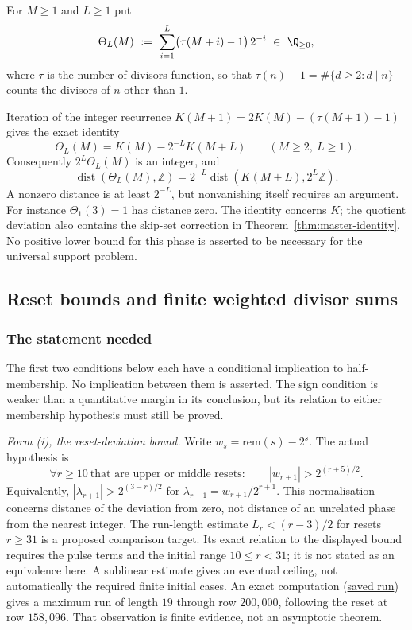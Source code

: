 \begin{defn}
\label{defn:theta}
For $M\ge 1$ and $L\ge 1$ put
\[
\Theta_L(M)\ :=\ \sum_{i=1}^{L}\bigl(\tau(M+i)-1\bigr)\,2^{-i}\ \in\ \Q_{\ge 0},
\]
where $\tau$ is the number-of-divisors function, so that $\tau(n)-1=\#\{d\ge 2: d\mid n\}$ counts
the divisors of $n$ other than $1$.
\end{defn}

Iteration of the integer recurrence
$K(M+1)=2K(M)-(\tau(M+1)-1)$ gives the exact identity
\[
 \Theta_L(M)=K(M)-2^{-L}K(M+L)\qquad(M\ge2,\ L\ge1).
\]
Consequently $2^L\Theta_L(M)$ is an integer, and
\[
 \operatorname{dist}(\Theta_L(M),\mathbb Z)
 =2^{-L}\operatorname{dist}(K(M+L),2^L\mathbb Z).
\]
A nonzero distance is at least $2^{-L}$, but nonvanishing itself
requires an argument.  For instance $\Theta_1(3)=1$ has distance
zero.  The identity concerns $K$; the quotient deviation also
contains the skip-set correction in
Theorem~\ref{thm:master-identity}.  No positive lower bound for
this phase is asserted to be necessary for the universal support
problem.

\subsection{Reset bounds and finite weighted divisor sums}
\label{sec:invent-R1}

\subsubsection*{The statement needed}

The first two conditions below each have a conditional implication to
half-membership.  No implication between them is asserted.  The sign
condition is weaker than a quantitative margin in its conclusion,
but its relation to either membership hypothesis must still be
proved.

\emph{Form (i), the reset-deviation bound.} Write
$w_s=\mathrm{rem}(s)-2^s$.  The actual hypothesis is
\[
 \forall r\ge10\ \text{that are upper or middle resets}:\qquad
 |w_{r+1}|>2^{(r+5)/2}.
\]
Equivalently, $|\lambda_{r+1}|>2^{(3-r)/2}$ for
$\lambda_{r+1}=w_{r+1}/2^{r+1}$.  This normalisation concerns
distance of the deviation from zero, not distance of an unrelated
phase from the nearest integer.
The run-length estimate $L_r<(r-3)/2$ for resets $r\ge31$ is a
proposed comparison target.  Its exact relation to the displayed
bound requires the pulse terms and the initial range $10\le r<31$;
it is not stated as an equivalence here.  A sublinear estimate gives
an eventual ceiling, not automatically the required finite initial
cases.  An exact computation
(\href{https://github.com/wcook04/plectis-erdos/blob/f757115e03bebe5c04431a147da559015c680a37/research/experiments/erdos257/receipts/seam-orbit-200000.json}{saved run})
gives a maximum run of length
$19$ through row $200{,}000$, following the reset at row $158{,}096$.
That observation is finite evidence, not an asymptotic theorem.

